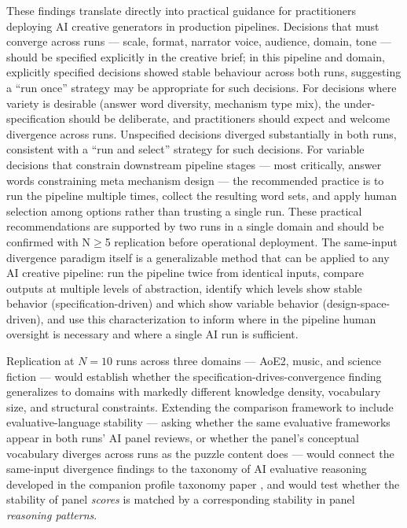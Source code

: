 These findings translate directly into practical guidance for practitioners deploying AI creative generators in production pipelines. Decisions that must converge across runs --- scale, format, narrator voice, audience, domain, tone --- should be specified explicitly in the creative brief; in this pipeline and domain, explicitly specified decisions showed stable behaviour across both runs, suggesting a ``run once'' strategy may be appropriate for such decisions. For decisions where variety is desirable (answer word diversity, mechanism type mix), the under-specification should be deliberate, and practitioners should expect and welcome divergence across runs. Unspecified decisions diverged substantially in both runs, consistent with a ``run and select'' strategy for such decisions. For variable decisions that constrain downstream pipeline stages --- most critically, answer words constraining meta mechanism design --- the recommended practice is to run the pipeline multiple times, collect the resulting word sets, and apply human selection among options rather than trusting a single run. These practical recommendations are supported by two runs in a single domain and should be confirmed with N$\geq$5 replication before operational deployment. The same-input divergence paradigm itself is a generalizable method that can be applied to any AI creative pipeline: run the pipeline twice from identical inputs, compare outputs at multiple levels of abstraction, identify which levels show stable behavior (specification-driven) and which show variable behavior (design-space-driven), and use this characterization to inform where in the pipeline human oversight is necessary and where a single AI run is sufficient.

Replication at $N = 10$ runs across three domains --- AoE2, music, and science fiction --- would establish whether the specification-drives-convergence finding generalizes to domains with markedly different knowledge density, vocabulary size, and structural constraints. Extending the comparison framework to include evaluative-language stability --- asking whether the same evaluative frameworks appear in both runs' AI panel reviews, or whether the panel's conceptual vocabulary diverges across runs as the puzzle content does --- would connect the same-input divergence findings to the taxonomy of AI evaluative reasoning developed in the companion profile taxonomy paper \citep{paper3}, and would test whether the stability of panel \textit{scores} is matched by a corresponding stability in panel \textit{reasoning patterns}.
